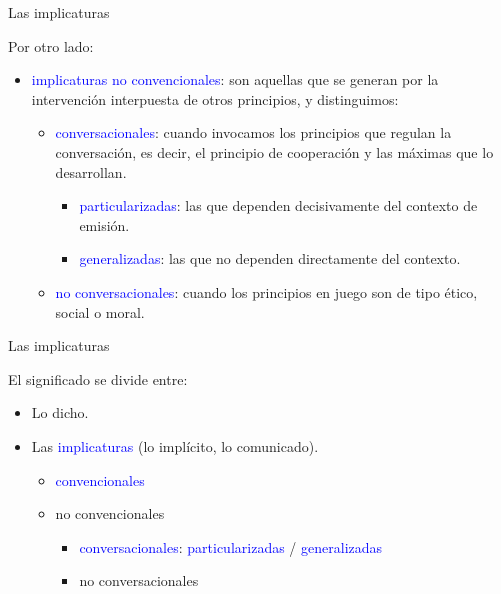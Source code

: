 \documentclass{beamer}
\begin{document}
\begin{frame}{Las implicaturas}

	Por otro lado:
	
	\begin{itemize}
		\item \textcolor{blue}{implicaturas no convencionales}: son aquellas que se generan por la intervención interpuesta de otros principios, y distinguimos:
		
		\begin{itemize}
			\item \textcolor{blue}{conversacionales}: cuando invocamos los principios que regulan la conversación, es decir, el principio de cooperación y las máximas que lo desarrollan.
			\begin{itemize}
				\item \textcolor{blue}{particularizadas}: las que dependen decisivamente del contexto de emisión.
				\item \textcolor{blue}{generalizadas}: las que no dependen directamente del contexto. 
			\end{itemize}
			\item \textcolor{blue}{no conversacionales}: cuando los principios en juego son de tipo ético, social o moral.
		\end{itemize}
		
	\end{itemize}

\end{frame}

\begin{frame}{Las implicaturas}

	El significado se divide entre:
	
	\begin{itemize}
		\item Lo dicho.
		\item Las \textcolor{blue}{implicaturas} (lo implícito, lo comunicado).
		\begin{itemize}
			\item \textcolor{blue}{convencionales}
			\item no convencionales
			\begin{itemize}
				\item \textcolor{blue}{conversacionales}: \textcolor{blue}{particularizadas} / \textcolor{blue}{generalizadas}
				\item no conversacionales
			\end{itemize}
		\end{itemize}
	\end{itemize}

\end{frame}
\end{document}
